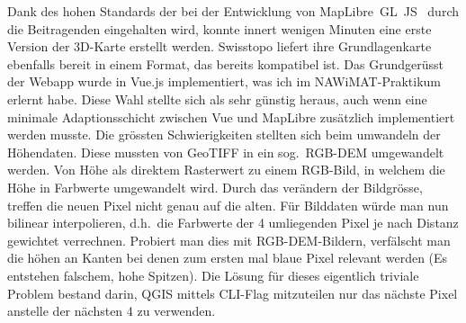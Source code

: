 Dank des hohen Standards der bei der Entwicklung von MapLibre~GL~JS~\cite{maplibregljs} durch die Beitragenden eingehalten wird, konnte innert wenigen Minuten eine erste Version der 3D-Karte erstellt werden. Swisstopo liefert ihre Grundlagenkarte ebenfalls bereit in einem Format, das bereits kompatibel ist. Das Grundgerüsst der Webapp wurde in Vue.js implementiert, was ich im NAWiMAT-Praktikum erlernt habe. Diese Wahl stellte sich als sehr günstig heraus, auch wenn eine minimale Adaptionsschicht zwischen Vue und MapLibre zusätzlich implementiert werden musste.
Die grössten Schwierigkeiten stellten sich beim umwandeln der Höhendaten. Diese mussten von GeoTIFF in ein sog.\ RGB-DEM umgewandelt werden. Von Höhe als direktem Rasterwert zu einem RGB-Bild, in welchem die Höhe in Farbwerte umgewandelt wird. Durch das verändern der Bildgrösse, treffen die neuen Pixel nicht genau auf die alten. Für Bilddaten würde man nun bilinear interpolieren, d.h.\ die Farbwerte der 4 umliegenden Pixel je nach Distanz gewichtet verrechnen. Probiert man dies mit RGB-DEM-Bildern, verfälscht man die höhen an Kanten bei denen zum ersten mal blaue Pixel relevant werden (Es entstehen falschem, hohe Spitzen). Die Lösung für dieses eigentlich triviale Problem bestand darin, QGIS mittels CLI-Flag mitzuteilen nur das nächste Pixel anstelle der nächsten 4 zu verwenden.


